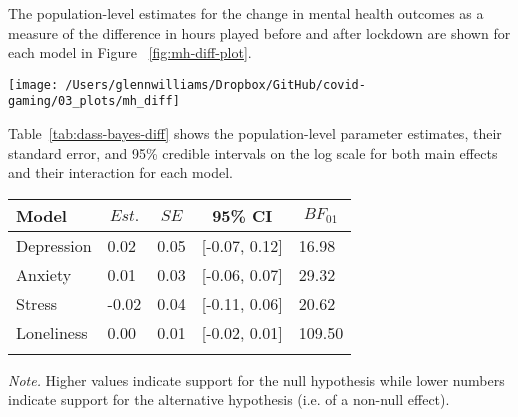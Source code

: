 \documentclass[
  english,
  jou,floatsintext]{apa6}
\begin{document}
The population-level estimates for the change in mental health outcomes as a measure of the difference in hours played before and after lockdown are shown for each model in Figure ~\ref{fig:mh-diff-plot}.

\begin{figure*}[!htbp]

{\centering \texttt{[image: /Users/glennwilliams/Dropbox/GitHub/covid-gaming/03\_plots/mh\_diff]} 

}

\caption{Change in mental health outcomes for the depression, anxiety, stress, and loneliness measures as a function of the difference in hours played before and after lockdown. Lines indicate the posterior median ± 50\%, 80\%, and 95\% credible intervals.}\label{fig:mh-diff-plot}
\end{figure*}

Table~\ref{tab:dass-bayes-diff} shows the population-level parameter estimates, their standard error, and 95\% credible intervals on the log scale for both main effects and their interaction for each model.

\begin{table*}[tbp]

\begin{center}
\begin{threeparttable}

\caption{\label{tab:dass-bayes-diff}Bayes factors for the depression, anxiety, stress, and loneliness models evaluating evidence in support of the point null hypothesis that the difference in hours played has no impact on the change in mental health outcomes.}

\begin{tabular}{lllll}
\toprule
Model & \multicolumn{1}{c}{$Est.$} & \multicolumn{1}{c}{$SE$} & \multicolumn{1}{c}{95\% CI} & \multicolumn{1}{c}{$BF_{01}$}\\
\midrule
Depression & 0.02 & 0.05 & [-0.07, 0.12] & 16.98\\
Anxiety & 0.01 & 0.03 & [-0.06, 0.07] & 29.32\\
Stress & -0.02 & 0.04 & [-0.11, 0.06] & 20.62\\
Loneliness & 0.00 & 0.01 & [-0.02, 0.01] & 109.50\\
\bottomrule
\addlinespace
\end{tabular}

\begin{tablenotes}[para]
\normalsize{\textit{Note.} Higher values indicate support for the null hypothesis while lower numbers indicate support for the alternative hypothesis (i.e. of a non-null effect).}
\end{tablenotes}

\end{threeparttable}
\end{center}

\end{table*}
\end{document}
